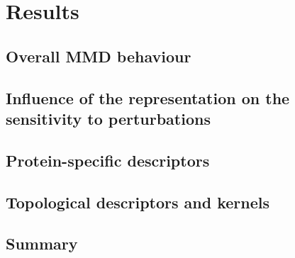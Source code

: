 \chapter{Results}

\section{Overall MMD behaviour}


\section{Influence of the representation on the sensitivity to perturbations}


\section{Protein-specific descriptors}


\section{Topological descriptors and kernels}










\section{Summary}
